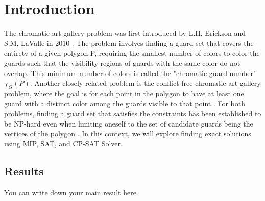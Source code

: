 \chapter{Introduction}
The chromatic art gallery problem was first introduced by L.H. Erickson and S.M. LaValle in 2010 \cite{erickson2010chromatic}. The problem involves finding a guard set that covers the entirety of a given polygon P, requiring the smallest number of colors to color the guards such that the visibility regions of guards with the same color do not overlap. This minimum number of colors is called the "chromatic guard number" $\chi_G(P)$. Another closely related problem is the conflict-free chromatic art gallery problem, where the goal is for each point in the polygon to have at least one guard with a distinct color among the guards visible to that point \cite{bartschi2014conflict}. For both problems, finding a guard set that satisfies the constraints has been established to be NP-hard even when limiting oneself to the set of candidate guards being the vertices of the polygon \cite{fekete2014chromatic}\cite{erickson2011many}\cite{iwamoto2022vertex}. In this context, we will explore finding exact solutions using MIP, SAT, and CP-SAT Solver.

\section{Results}
You can write down your main result here.


